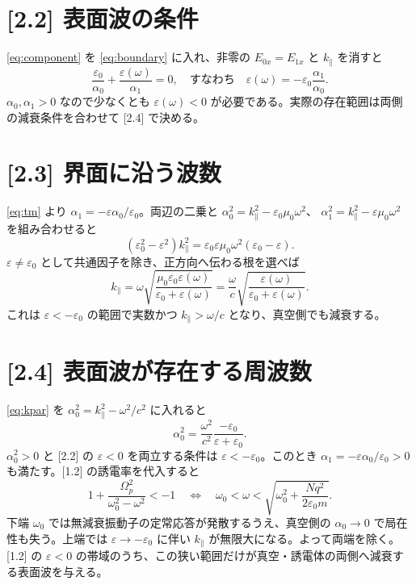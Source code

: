 \documentclass[11pt,a4paper]{article}
\begin{document}
\section*{[2.2] 表面波の条件}
\eqref{eq:component} を \eqref{eq:boundary} に入れ、非零の $E_{0x}=E_{1x}$ と $k_{\parallel}$ を消すと
\begin{equation}
\boxed{\frac{\varepsilon_0}{\alpha_0}+\frac{\varepsilon(\omega)}{\alpha_1}=0,
\quad\text{すなわち}\quad
\varepsilon(\omega)=-\varepsilon_0\frac{\alpha_1}{\alpha_0}}.
\label{eq:tm}
\end{equation}
$\alpha_0,\alpha_1>0$ なので少なくとも $\varepsilon(\omega)<0$ が必要である。実際の存在範囲は両側の減衰条件を合わせて [2.4] で決める。

\section*{[2.3] 界面に沿う波数}
\eqref{eq:tm} より $\alpha_1=-\varepsilon\alpha_0/\varepsilon_0$。両辺の二乗と
$\alpha_0^2=k_{\parallel}^2-\varepsilon_0\mu_0\omega^2$、
$\alpha_1^2=k_{\parallel}^2-\varepsilon\mu_0\omega^2$ を組み合わせると
\begin{equation}
(\varepsilon_0^2-\varepsilon^2)k_{\parallel}^2
=\varepsilon_0\varepsilon\mu_0\omega^2(\varepsilon_0-\varepsilon).
\end{equation}
$\varepsilon\ne\varepsilon_0$ として共通因子を除き、正方向へ伝わる根を選べば
\begin{equation}
\boxed{k_{\parallel}=\omega\sqrt{\frac{\mu_0\varepsilon_0\varepsilon(\omega)}
{\varepsilon_0+\varepsilon(\omega)}}
=\frac{\omega}{c}\sqrt{\frac{\varepsilon(\omega)}
{\varepsilon_0+\varepsilon(\omega)}}}.
\label{eq:kpar}
\end{equation}
これは $\varepsilon<-\varepsilon_0$ の範囲で実数かつ $k_{\parallel}>\omega/c$ となり、真空側でも減衰する。

\section*{[2.4] 表面波が存在する周波数}
\eqref{eq:kpar} を $\alpha_0^2=k_{\parallel}^2-\omega^2/c^2$ に入れると
\begin{equation}
\alpha_0^2=\frac{\omega^2}{c^2}\frac{-\varepsilon_0}{\varepsilon+\varepsilon_0}.
\end{equation}
$\alpha_0^2>0$ と [2.2] の $\varepsilon<0$ を両立する条件は $\varepsilon<-\varepsilon_0$。このとき $\alpha_1=-\varepsilon\alpha_0/\varepsilon_0>0$ も満たす。[1.2] の誘電率を代入すると
\begin{equation}
1+\frac{\Omega_p^2}{\omega_0^2-\omega^2}<-1
\quad\Longleftrightarrow\quad
\boxed{\omega_0<\omega<\sqrt{\omega_0^2+\frac{Nq^2}{2\varepsilon_0m}}}.
\end{equation}
下端 $\omega_0$ では無減衰振動子の定常応答が発散するうえ、真空側の $\alpha_0\to0$ で局在性も失う。上端では $\varepsilon\to-\varepsilon_0$ に伴い $k_{\parallel}$ が無限大になる。よって両端を除く。[1.2] の $\varepsilon<0$ の帯域のうち、この狭い範囲だけが真空・誘電体の両側へ減衰する表面波を与える。
\end{document}
